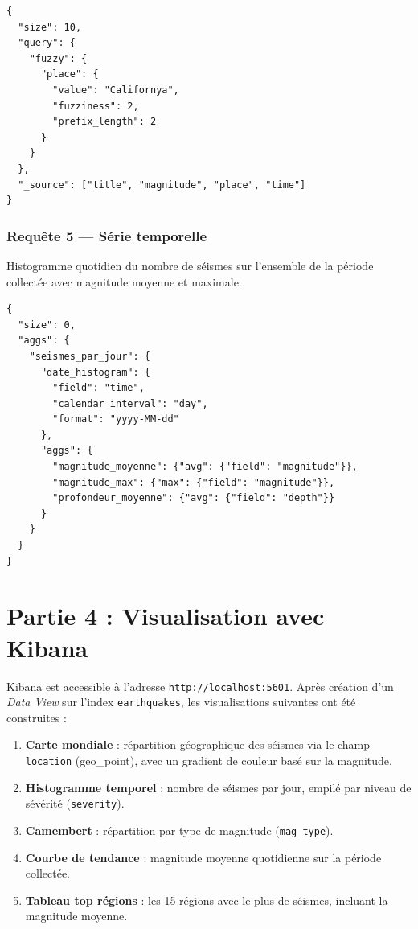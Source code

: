\documentclass[12pt,a4paper]{article}
\begin{document}
\begin{lstlisting}[style=json, caption={Requête fuzzy — tolérance aux erreurs de saisie}]
{
  "size": 10,
  "query": {
    "fuzzy": {
      "place": {
        "value": "Californya",
        "fuzziness": 2,
        "prefix_length": 2
      }
    }
  },
  "_source": ["title", "magnitude", "place", "time"]
}
\end{lstlisting}

% 

\subsubsection{Requête 5 — Série temporelle}

Histogramme quotidien du nombre de séismes sur l'ensemble de la période collectée avec magnitude moyenne et maximale.

\begin{lstlisting}[style=json, caption={Série temporelle — activité sismique quotidienne}]
{
  "size": 0,
  "aggs": {
    "seismes_par_jour": {
      "date_histogram": {
        "field": "time",
        "calendar_interval": "day",
        "format": "yyyy-MM-dd"
      },
      "aggs": {
        "magnitude_moyenne": {"avg": {"field": "magnitude"}},
        "magnitude_max": {"max": {"field": "magnitude"}},
        "profondeur_moyenne": {"avg": {"field": "depth"}}
      }
    }
  }
}
\end{lstlisting}

% 

\section{Partie 4 : Visualisation avec Kibana}

Kibana est accessible à l'adresse \texttt{http://localhost:5601}. Après création d'un \textit{Data View} sur l'index \texttt{earthquakes}, les visualisations suivantes ont été construites :

\begin{enumerate}[noitemsep]
    \item \textbf{Carte mondiale} : répartition géographique des séismes via le champ \texttt{location} (geo\_point), avec un gradient de couleur basé sur la magnitude.
    \item \textbf{Histogramme temporel} : nombre de séismes par jour, empilé par niveau de sévérité (\texttt{severity}).
    \item \textbf{Camembert} : répartition par type de magnitude (\texttt{mag\_type}).
    \item \textbf{Courbe de tendance} : magnitude moyenne quotidienne sur la période collectée.
    \item \textbf{Tableau top régions} : les 15 régions avec le plus de séismes, incluant la magnitude moyenne.
\end{enumerate}
\end{document}
